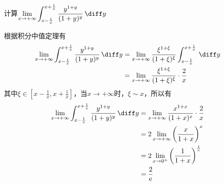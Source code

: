 \begin{example}
    计算$\displaystyle\lim_{x\to+\infty}\int_{x-\frac{1}{x}}^{x+\frac{1}{x}}\frac{y^{1+y}}{(1+y)^y}\,\diff y$
\end{example}
\begin{solution}
    根据积分中值定理有
    \begin{align*}
        \lim_{x\to+\infty}\int_{x-\frac{1}{x}}^{x+\frac{1}{x}}\frac{y^{1+y}}{(1+y)^y}\,\diff y
         & = \lim_{x\to+\infty} \frac{\xi^{1+\xi}}{(1+\xi)^\xi} \int_{x-\frac{1}{x}}^{x+\frac{1}{x}}\,\diff y \\
         & = \lim_{x\to+\infty} \frac{\xi^{1+\xi}}{(1+\xi)^\xi} \cdot \frac{2}{x}                             \\
    \end{align*}
    其中$\xi\in[x-\frac{1}{x},x+\frac{1}{x}]$，当$x\to+\infty$时，$\xi \sim x$，所以有
    \begin{align*}
        \lim_{x\to+\infty}\int_{x-\frac{1}{x}}^{x+\frac{1}{x}}\frac{y^{1+y}}{(1+y)^y}\,\diff y
         & = \lim_{x\to+\infty} \frac{x^{1+x}}{(1+x)^x} \cdot \frac{2}{x} \\
         & = 2\lim_{x\to+\infty} \left(\frac{x}{1+x}\right)^x             \\
         & = 2\lim_{x\to 0^+} \left(\frac{1}{1+x}\right)^\frac{1}{x}      \\
         & =\frac{2}{\mathrm{e}}
    \end{align*}
\end{solution}



